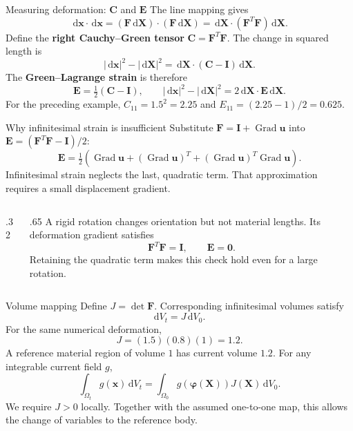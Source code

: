 \documentclass[11pt,aspectratio=169]{beamer}
\newcommand{\bu}{\bm u}
\newcommand{\bx}{\bm x}
\newcommand{\bX}{\bm X}
\newcommand{\bI}{\bm I}
\newcommand{\bF}{\bm F}
\newcommand{\bC}{\bm C}
\newcommand{\bE}{\bm E}
\newcommand{\bphi}{\bm\varphi}
\newcommand{\Grad}{\operatorname{Grad}}
\newcommand{\dd}{\,\mathrm d}
\begin{document}
\begin{frame}{Measuring deformation: $\bC$ and $\bE$}
The line mapping gives
\[
\dd\bx\cdot\dd\bx
=(\bF\dd\bX)\cdot(\bF\dd\bX)
=\dd\bX\cdot(\bF^T\bF)\dd\bX.
\]
Define the \textbf{right Cauchy--Green tensor} $\bC=\bF^T\bF$.
The change in squared length is
\[
|\dd\bx|^2-|\dd\bX|^2
=\dd\bX\cdot(\bC-\bI)\dd\bX.
\]
The \textbf{Green--Lagrange strain} is therefore
\[
\boxed{
\bE=\tfrac12(\bC-\bI),\qquad
|\dd\bx|^2-|\dd\bX|^2=2\dd\bX\cdot\bE\dd\bX.
}
\]
For the preceding example,
$C_{11}=1.5^2=2.25$ and $E_{11}=(2.25-1)/2=0.625$.
\end{frame}

\begin{frame}{Why infinitesimal strain is insufficient}
Substitute $\bF=\bI+\Grad\bu$ into $\bE=(\bF^T\bF-\bI)/2$:
\[
\boxed{
\bE=\tfrac12\left(
\Grad\bu+(\Grad\bu)^T+(\Grad\bu)^T\Grad\bu
\right).
}
\]
Infinitesimal strain neglects the last, quadratic term.
That approximation requires a small displacement gradient.
\begin{columns}[c,onlytextwidth]
\begin{column}{.32\textwidth}
\centering
{}
\end{column}
\begin{column}{.65\textwidth}
A rigid rotation changes orientation but not material lengths.
Its deformation gradient satisfies
\[
\bF^T\bF=\bI,\qquad \bE=\bm0.
\]
Retaining the quadratic term makes this check hold even for a large rotation.
\end{column}
\end{columns}
\end{frame}

\begin{frame}{Volume mapping}
Define $J=\det\bF$. Corresponding infinitesimal volumes satisfy
\[
\boxed{\mathrm dV_t=J\,\mathrm dV_0.}
\]
For the same numerical deformation,
\[
J=(1.5)(0.8)(1)=1.2.
\]
A reference material region of volume $1$ has current volume $1.2$.
For any integrable current field $g$,
\[
\boxed{
\int_{\Omega_t}g(\bx)\,\mathrm dV_t
=\int_{\Omega_0}g(\bphi(\bX))J(\bX)\,\mathrm dV_0.
}
\]
We require $J>0$ locally. Together with the assumed one-to-one map, this
allows the change of variables to the reference body.
\end{frame}
\end{document}
